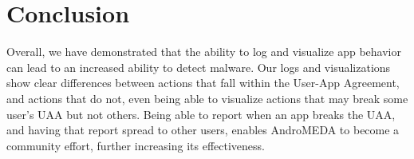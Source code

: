 \section{Conclusion}
Overall, we have demonstrated that the ability to log and visualize app behavior can lead to an increased ability to detect malware. Our logs and visualizations show clear differences between actions that fall within the User-App Agreement, and actions that do not, even being able to visualize actions that may break some user's UAA but not others. Being able to report when an app breaks the UAA, and having that report spread to other users, enables AndroMEDA to become a community effort, further increasing its effectiveness.





